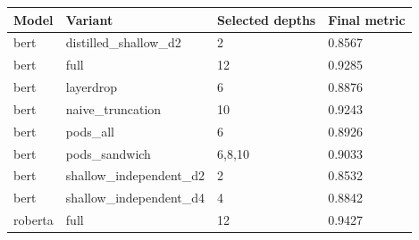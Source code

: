 \begin{tabular}{llll}
\hline
Model & Variant & Selected depths & Final metric \\
\hline
bert & distilled\_shallow\_d2 & 2 & 0.8567 \\
bert & full & 12 & 0.9285 \\
bert & layerdrop & 6 & 0.8876 \\
bert & naive\_truncation & 10 & 0.9243 \\
bert & pods\_all & 6 & 0.8926 \\
bert & pods\_sandwich & 6,8,10 & 0.9033 \\
bert & shallow\_independent\_d2 & 2 & 0.8532 \\
bert & shallow\_independent\_d4 & 4 & 0.8842 \\
roberta & full & 12 & 0.9427 \\
\hline
\end{tabular}

